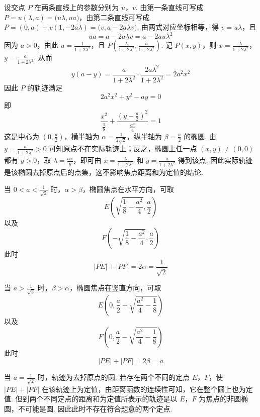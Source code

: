 \begin{solution}
设交点 \(P\) 在两条直线上的参数分别为 \(u\)，\(v\). 由第一条直线可写成 \(P=u(\lambda,a)=\bigl(u\lambda,ua\bigr)\)，由第二条直线可写成 \(P=(0,a)+v(1,-2a\lambda)=\bigl(v,a-2a\lambda v\bigr)\).
由两式对应坐标相等，得 \(v=u\lambda\)，且
\[
ua=a-2a\lambda v=a-2au\lambda^{2}
\]
因为 \(a>0\)，由此 \(u=\frac{1}{1+2\lambda^{2}}\)，且 \(P\left(\frac{\lambda}{1+2\lambda^{2}},\frac{a}{1+2\lambda^{2}}\right)\).
记 \(P(x,y)\)，则 \(x=\frac{\lambda}{1+2\lambda^{2}}\)，\(y=\frac{a}{1+2\lambda^{2}}\).
从而
\[
y(a-y)=\frac{a}{1+2\lambda^{2}}\cdot\frac{2a\lambda^{2}}{1+2\lambda^{2}}
=2a^{2}x^{2}
\]
因此 \(P\) 的轨迹满足
\[
2a^{2}x^{2}+y^{2}-ay=0
\]
即
\[
\frac{x^{2}}{\frac{1}{8}}+\frac{\left(y-\frac{a}{2}\right)^{2}}{\frac{a^{2}}{4}}=1
\]
这是中心为 \(\left(0,\frac{a}{2}\right)\)，横半轴为 \(\alpha=\frac{1}{2\sqrt{2}}\)，纵半轴为 \(\beta=\frac{a}{2}\) 的椭圆. 由 \(y=\frac{a}{1+2\lambda^{2}}>0\) 可知原点不在实际轨迹上；反之，椭圆上任一点 \((x,y)\ne(0,0)\) 都有 \(y>0\)，取 \(\lambda=\frac{ax}{y}\)，即可由 \(x=\frac{\lambda}{1+2\lambda^{2}}\) 和 \(y=\frac{a}{1+2\lambda^{2}}\) 得到该点. 因此实际轨迹是该椭圆去掉原点后的点集，这不影响焦点距离和为定值的结论.

当 \(0<a<\frac{1}{\sqrt{2}}\) 时，\(\alpha>\beta\)，椭圆焦点在水平方向，可取
\[
E\left(\sqrt{\frac18-\frac{a^{2}}4},\frac{a}{2}\right)
\]
以及
\[
F\left(-\sqrt{\frac18-\frac{a^{2}}4},\frac{a}{2}\right)
\]
此时
\[
|PE|+|PF|=2\alpha=\frac{1}{\sqrt{2}}
\]

当 \(a>\frac{1}{\sqrt{2}}\) 时，\(\beta>\alpha\)，椭圆焦点在竖直方向，可取
\[
E\left(0,\frac{a}{2}+\sqrt{\frac{a^{2}}4-\frac18}\right)
\]
以及
\[
F\left(0,\frac{a}{2}-\sqrt{\frac{a^{2}}4-\frac18}\right)
\]
此时
\[
|PE|+|PF|=2\beta=a
\]

当 \(a=\frac{1}{\sqrt{2}}\) 时，轨迹为去掉原点的圆. 若存在两个不同的定点 \(E\)，\(F\)，使 \(|PE|+|PF|\) 在该轨迹上为定值，由距离函数的连续性可知，它在整个圆上也为定值. 但到两个不同定点的距离和为定值所表示的轨迹是以 \(E\)，\(F\) 为焦点的非圆椭圆，不可能是圆. 因此此时不存在符合题意的两个定点.
\end{solution}
